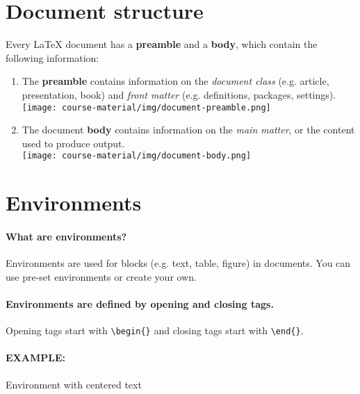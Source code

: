 \documentclass[11pt]{article}
\begin{document}

\newpage
\section*{Document structure}

Every {\LaTeX} document has a \textbf{preamble} and a \textbf{body}, which contain the following information:

\begin{enumerate}
    \item The \textbf{preamble} contains information on the \textit{document class} (e.g. article, presentation, book) and \textit{front matter} (e.g. definitions, packages, settings).\\\texttt{[image: course-material/img/document-preamble.png]}
    \item The document \textbf{body} contains information on the \textit{main matter}, or the content used to produce output.\\\texttt{[image: course-material/img/document-body.png]}
\end{enumerate}

\section*{Environments}

\paragraph{What are environments?} Environments are used for blocks (e.g. text, table, figure) in documents. You can use pre-set environments or create your own.

\paragraph{Environments are defined by opening and closing tags.} Opening tags start with \verb|\begin{}| and closing tags start with \verb|\end{}|.

\paragraph{EXAMPLE:} Environment with centered text
\end{document}
